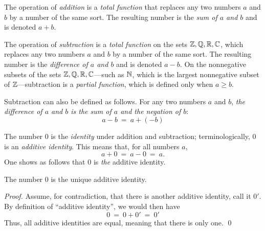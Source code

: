 The operation of {\it addition} is a {\em
  total function} that replaces any two numbers $a$ and $b$ by a
number of the same sort.  The resulting number is the {\em sum of $a$
  and $b$} and is denoted $a+b$.

\noindent
The operation of {\it subtraction} is a
{\em total function} on the sets $\mathbb{Z}, \mathbb{Q}, \mathbb{R}, \mathbb{C}$, which replaces any
two numbers $a$ and $b$ by a number of the same sort.  The resulting
number is the {\em difference of $a$ and $b$}
 and is denoted $a-b$.  On
the nonnegative subsets of the sets $\mathbb{Z}, \mathbb{Q}, \mathbb{R}, \mathbb{C}$---such as $\mathbb{N}$,
which is the largest nonnegative subset of $\mathbb{Z}$---subtraction is a
{\em partial function}, which is defined only when $a \geq b$.

Subtraction can also be defined as follows.  For any two numbers $a$
and $b$, {\em the difference of $a$ and $b$ is the sum of $a$ and the
  negation of $b$}:
\[ a-b \ = \ a + (-b) \]

\medskip

The number $0$ is the {\it identity} under addition and
  subtraction;
terminologically, $0$ is an {\it additive identity}.  This means that,
for all numbers $a$,
\[ a+0 \ = \ a-0 \ = \ a. \]
One shows as follows that $0$ is {\em the} additive identity.

\begin{prop}
\label{thm:unique-add-iden}
The number $0$ is the unique additive identity.
\end{prop}

\begin{proof}
Assume, for contradiction, that there is another additive identity,
call it $0'$.  By definition of ``additive identity'', we would then
have
\[ 0 \ = \ 0 + 0' \ = \ 0' \]
Thus, all additive identities are equal, meaning that there is only
one.  \qed
\end{proof}

\medskip

